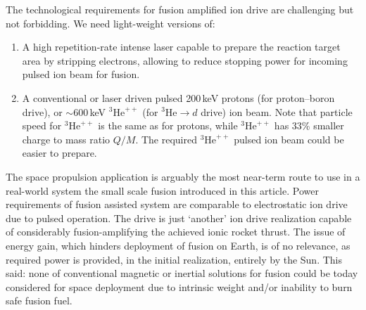 \documentclass[particles,article,accept,pdftex,moreauthors]{Definitions/mdpi}
\begin{document}
The technological requirements for fusion amplified ion drive are challenging but not forbidding. We need light-weight versions of:
\begin{enumerate}
\item 
A high repetition-rate intense laser capable to prepare the reaction target area by stripping electrons, allowing to reduce stopping power for incoming pulsed ion beam for fusion. 
\item
A conventional or laser driven pulsed 200\,keV protons (for proton--boron drive), or $\sim$600\,keV ${}^3\mathrm{He}^{++}$ (for ${}^3\mathrm{He}\to d$ drive) ion beam. Note that particle speed for ${}^3\mathrm{He}^{++}$ is the same as for protons, while ${}^3\mathrm{He}^{++}$ has 33\% smaller charge to mass ratio $Q/M$. The required ${}^3\mathrm{He}^{++}$ pulsed ion beam could be easier to prepare.
\end{enumerate}

The space propulsion application is arguably the most near-term route to use in a real-world system the small scale fusion introduced in this article. Power requirements of fusion assisted system are comparable to electrostatic ion drive due to pulsed operation. The drive is just `another' ion drive realization capable of considerably fusion-amplifying the achieved ionic rocket thrust. The issue of energy gain, which hinders deployment of fusion on Earth, is of no relevance, as required power is provided, in the initial realization, entirely by the Sun. This said: none of conventional magnetic or inertial solutions for fusion could be today considered for space deployment due to intrinsic weight and/or inability to burn safe fusion fuel. 

\end{document}

